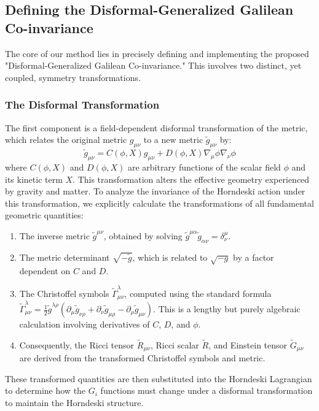 \documentclass[twocolumn]{aastex631}
\begin{document}
\subsection{Defining the Disformal-Generalized Galilean Co-invariance}
The core of our method lies in precisely defining and implementing the proposed "Disformal-Generalized Galilean Co-invariance." This involves two distinct, yet coupled, symmetry transformations.

\subsubsection{The Disformal Transformation}
The first component is a field-dependent disformal transformation of the metric, which relates the original metric $g_{\mu\nu}$ to a new metric $\tilde{g}_{\mu\nu}$ by:
$$
\tilde{g}_{\mu\nu} = C(\phi, X) g_{\mu\nu} + D(\phi, X) \nabla_\mu\phi \nabla_\nu\phi
$$
where $C(\phi, X)$ and $D(\phi, X)$ are arbitrary functions of the scalar field $\phi$ and its kinetic term $X$. This transformation alters the effective geometry experienced by gravity and matter. To analyze the invariance of the Horndeski action under this transformation, we explicitly calculate the transformations of all fundamental geometric quantities:
\begin{enumerate}
    \item The inverse metric $\tilde{g}^{\mu\nu}$, obtained by solving $\tilde{g}^{\mu\alpha} \tilde{g}_{\alpha\nu} = \delta^\mu_\nu$.
    \item The metric determinant $\sqrt{-\tilde{g}}$, which is related to $\sqrt{-g}$ by a factor dependent on $C$ and $D$.
    \item The Christoffel symbols $\tilde{\Gamma}^\lambda_{\mu\nu}$, computed using the standard formula $\tilde{\Gamma}^\lambda_{\mu\nu} = \frac{1}{2}\tilde{g}^{\lambda\rho}(\partial_\mu \tilde{g}_{\nu\rho} + \partial_\nu \tilde{g}_{\mu\rho} - \partial_\rho \tilde{g}_{\mu\nu})$. This is a lengthy but purely algebraic calculation involving derivatives of $C$, $D$, and $\phi$.
    \item Consequently, the Ricci tensor $\tilde{R}_{\mu\nu}$, Ricci scalar $\tilde{R}$, and Einstein tensor $\tilde{G}_{\mu\nu}$ are derived from the transformed Christoffel symbols and metric.
\end{enumerate}
These transformed quantities are then substituted into the Horndeski Lagrangian to determine how the $G_i$ functions must change under a disformal transformation to maintain the Horndeski structure.
\end{document}
